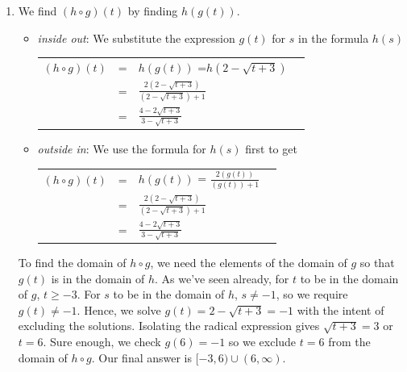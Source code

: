 \documentclass{ximera}
\begin{document}
\begin{example}
\begin{explanation}
\begin{enumerate}
\begin{image}
% 
\end{image} 

hence our  domain is $(-\infty, -1) \cup \left[-\frac{3}{5}, \infty\right)$.

\item  We find $(h \circ g)(t)$ by finding $h(g(t))$.

\begin{itemize}

\item  \textit{inside out}: We substitute the expression $g(t)$  for $s$ in the formula $h(s)$
\begin{longtable}{rclr} $(h \circ g)(t)$ & = & $h(g(t))$ =$h\left(2-\sqrt{t+3}\right)$ & \\  
 & = & $\frac{2 \left(2-\sqrt{t+3} \right)}{\left(2-\sqrt{t+3}\right)+1}$ & \\
 & = & $\frac{4-2\sqrt{t+3}}{3-\sqrt{t+3}}$ & \\
  \end{longtable}

\item  \textit{outside in}:  We use the formula for $h(s)$ first to get
\begin{longtable}{rclr} $(h \circ g)(t)$ & = & $h(g(t))$ = $\frac{2 \left(g(t)\right)}{\left( g(t)\right) + 1}$ & \\
 & = & $\frac{2 \left(2-\sqrt{t+3} \right)}{\left(2-\sqrt{t+3}\right)+1}$ & \\
 & = & $\frac{4-2\sqrt{t+3}}{3-\sqrt{t+3}}$ & \\
  \end{longtable}
 
 \end{itemize}

To find the domain of $h \circ g$, we need the elements of the domain of $g$ so that $g(t)$ is in the domain of $h$.  As we've seen already, for $t$ to be in the domain of $g$, $t \geq -3$. For $s$ to be in the domain of $h$, $s \neq -1$, so we require $g(t) \neq -1$.  Hence, we solve $g(t) = 2-\sqrt{t+3} = -1$ with the intent of excluding the solutions. Isolating the radical expression gives $\sqrt{t+3} = 3$ or $t = 6$.  Sure enough, we check $g(6)=-1$ so we exclude $t=6$ from the domain of $h \circ g$.  Our final answer is $[-3, 6) \cup (6, \infty)$.


\end{enumerate}
\end{explanation}
\end{example}
\end{document}
